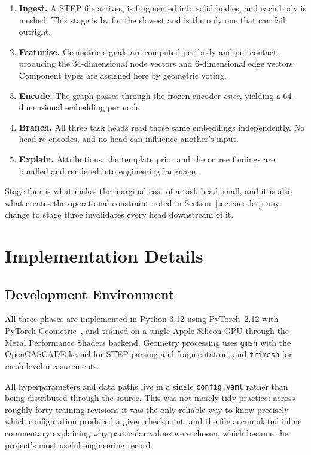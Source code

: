 \documentclass[12pt,oneside,a4paper]{report}
\begin{document}
\begin{enumerate}[leftmargin=2.0cm]
\item \textbf{Ingest.} A STEP file arrives, is fragmented into solid bodies, and
each body is meshed. This stage is by far the slowest and is the only one that
can fail outright.
\item \textbf{Featurise.} Geometric signals are computed per body and per
contact, producing the 34-dimensional node vectors and 6-dimensional edge
vectors. Component types are assigned here by geometric voting.
\item \textbf{Encode.} The graph passes through the frozen encoder \emph{once},
yielding a 64-dimensional embedding per node.
\item \textbf{Branch.} All three task heads read those same embeddings
independently. No head re-encodes, and no head can influence another's input.
\item \textbf{Explain.} Attributions, the template prior and the octree findings
are bundled and rendered into engineering language.
\end{enumerate}

Stage four is what makes the marginal cost of a task head small, and it is also
what creates the operational constraint noted in Section~\ref{sec:encoder}: any
change to stage three invalidates every head downstream of it.

\chapter{Implementation Details}

\section{Development Environment}

All three phases are implemented in Python 3.12 using
PyTorch~2.12 with PyTorch Geometric~\cite{fey2019pyg}, and trained on a
single Apple-Silicon GPU through the Metal Performance Shaders backend.
Geometry processing uses \texttt{gmsh} with the OpenCASCADE kernel for STEP
parsing and fragmentation, and \texttt{trimesh} for mesh-level measurements.

All hyperparameters and data paths live in a single \texttt{config.yaml}
rather than being distributed through the source. This was not merely tidy
practice: across roughly forty training revisions it was the only reliable
way to know precisely which configuration produced a given checkpoint, and
the file accumulated inline commentary explaining why particular values were
chosen, which became the project's most useful engineering record.
\end{document}
